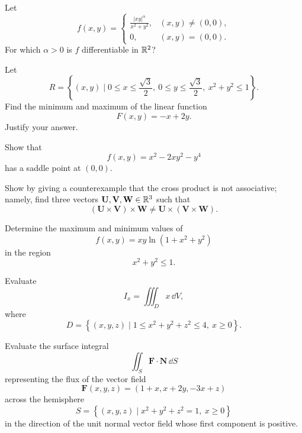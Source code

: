 \begin{problem}
Let
\[
f(x, y)=
\begin{cases}
\displaystyle\frac{|xy|^\alpha}{x^2+y^2}, & (x, y)\ne(0, 0), \\[0.55em]
0, & (x, y)=(0, 0).
\end{cases}
\]
For which $\alpha>0$ is $f$ differentiable in $\mathbb{R}^2$?
\end{problem}

\begin{problem}
Let
\[
R=\left\{(x, y)\mid 0\le x\le\frac{\sqrt3}{2}, \ 0\le y\le\frac{\sqrt3}{2}, \ x^2+y^2\le1\right\}.
\]
Find the minimum and maximum of the linear function
\[
F(x, y)=-x+2y.
\]
Justify your answer.
\end{problem}

\begin{problem}
Show that
\[
f(x, y)=x^2-2xy^2-y^4
\]
has a saddle point at $(0, 0)$.
\end{problem}

\begin{problem}
Show by giving a counterexample that the cross product is not associative; namely, find three vectors $\mathbf U, \mathbf V, \mathbf W\in\mathbb{R}^3$ such that
\[
(\mathbf U\times\mathbf V)\times\mathbf W
\ne
\mathbf U\times(\mathbf V\times\mathbf W).
\]
\end{problem}

\begin{problem}
Determine the maximum and minimum values of
\[
f(x, y)=xy\ln(1+x^2+y^2)
\]
in the region
\[
x^2+y^2\le1.
\]
\end{problem}

\begin{problem}
Evaluate
\[
I_x=\iiint_D x\,\dd V,
\]
where
\[
D=\left\{(x, y, z)\mid 1\le x^2+y^2+z^2\le4, \ x\ge0\right\}.
\]
\end{problem}

\begin{problem}
Evaluate the surface integral
\[
\iint_S \mathbf F\cdot\mathbf N\,\dd S
\]
representing the flux of the vector field
\[
\mathbf F(x, y, z)=(1+x, x+2y, -3x+z)
\]
across the hemisphere
\[
S=\left\{(x, y, z)\mid x^2+y^2+z^2=1, \ x\ge0\right\}
\]
in the direction of the unit normal vector field whose first component is positive.
\end{problem}

